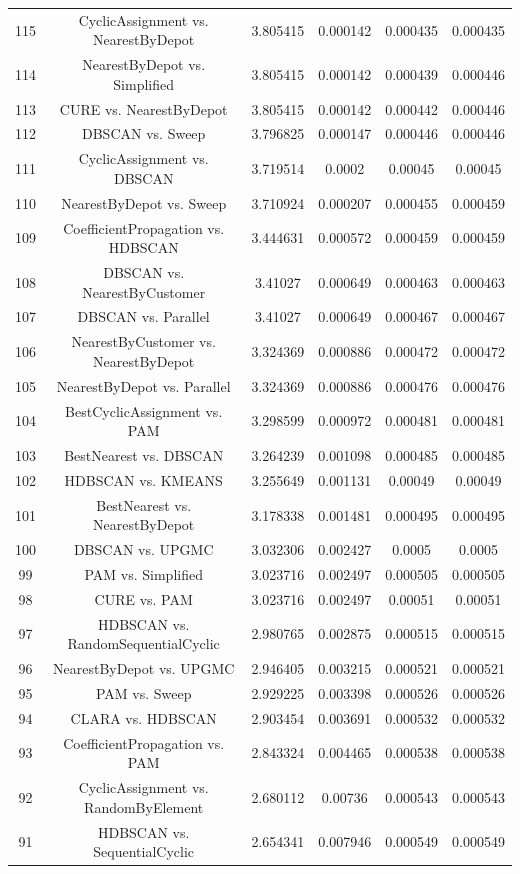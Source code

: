 \documentclass[a4paper,10pt]{article}
\begin{document}
\begin{landscape}
\begin{table}[!htp]
\begin{tabular}{cccccc}
115&CyclicAssignment vs. NearestByDepot&3.805415&0.000142&0.000435&0.000435\\
114&NearestByDepot vs. Simplified&3.805415&0.000142&0.000439&0.000446\\
113&CURE vs. NearestByDepot&3.805415&0.000142&0.000442&0.000446\\
112&DBSCAN vs. Sweep&3.796825&0.000147&0.000446&0.000446\\
111&CyclicAssignment vs. DBSCAN&3.719514&0.0002&0.00045&0.00045\\
110&NearestByDepot vs. Sweep&3.710924&0.000207&0.000455&0.000459\\
109&CoefficientPropagation vs. HDBSCAN&3.444631&0.000572&0.000459&0.000459\\
108&DBSCAN vs. NearestByCustomer&3.41027&0.000649&0.000463&0.000463\\
107&DBSCAN vs. Parallel&3.41027&0.000649&0.000467&0.000467\\
106&NearestByCustomer vs. NearestByDepot&3.324369&0.000886&0.000472&0.000472\\
105&NearestByDepot vs. Parallel&3.324369&0.000886&0.000476&0.000476\\
104&BestCyclicAssignment vs. PAM&3.298599&0.000972&0.000481&0.000481\\
103&BestNearest vs. DBSCAN&3.264239&0.001098&0.000485&0.000485\\
102&HDBSCAN vs. KMEANS&3.255649&0.001131&0.00049&0.00049\\
101&BestNearest vs. NearestByDepot&3.178338&0.001481&0.000495&0.000495\\
100&DBSCAN vs. UPGMC&3.032306&0.002427&0.0005&0.0005\\
99&PAM vs. Simplified&3.023716&0.002497&0.000505&0.000505\\
98&CURE vs. PAM&3.023716&0.002497&0.00051&0.00051\\
97&HDBSCAN vs. RandomSequentialCyclic&2.980765&0.002875&0.000515&0.000515\\
96&NearestByDepot vs. UPGMC&2.946405&0.003215&0.000521&0.000521\\
95&PAM vs. Sweep&2.929225&0.003398&0.000526&0.000526\\
94&CLARA vs. HDBSCAN&2.903454&0.003691&0.000532&0.000532\\
93&CoefficientPropagation vs. PAM&2.843324&0.004465&0.000538&0.000538\\
92&CyclicAssignment vs. RandomByElement&2.680112&0.00736&0.000543&0.000543\\
91&HDBSCAN vs. SequentialCyclic&2.654341&0.007946&0.000549&0.000549\\

\end{tabular}
\end{table}
\end{landscape}
\end{document}
